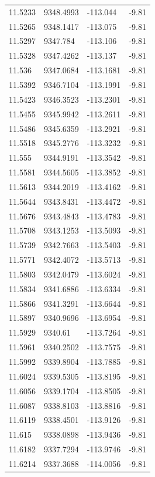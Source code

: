 \begin{table}[H]
\begin{tabular}{llll}
11.5233 & 9348.4993 & -113.044 & -9.81 \\
11.5265 & 9348.1417 & -113.075 & -9.81 \\
11.5297 & 9347.784 & -113.106 & -9.81 \\
11.5328 & 9347.4262 & -113.137 & -9.81 \\
11.536 & 9347.0684 & -113.1681 & -9.81 \\
11.5392 & 9346.7104 & -113.1991 & -9.81 \\
11.5423 & 9346.3523 & -113.2301 & -9.81 \\
11.5455 & 9345.9942 & -113.2611 & -9.81 \\
11.5486 & 9345.6359 & -113.2921 & -9.81 \\
11.5518 & 9345.2776 & -113.3232 & -9.81 \\
11.555 & 9344.9191 & -113.3542 & -9.81 \\
11.5581 & 9344.5605 & -113.3852 & -9.81 \\
11.5613 & 9344.2019 & -113.4162 & -9.81 \\
11.5644 & 9343.8431 & -113.4472 & -9.81 \\
11.5676 & 9343.4843 & -113.4783 & -9.81 \\
11.5708 & 9343.1253 & -113.5093 & -9.81 \\
11.5739 & 9342.7663 & -113.5403 & -9.81 \\
11.5771 & 9342.4072 & -113.5713 & -9.81 \\
11.5803 & 9342.0479 & -113.6024 & -9.81 \\
11.5834 & 9341.6886 & -113.6334 & -9.81 \\
11.5866 & 9341.3291 & -113.6644 & -9.81 \\
11.5897 & 9340.9696 & -113.6954 & -9.81 \\
11.5929 & 9340.61 & -113.7264 & -9.81 \\
11.5961 & 9340.2502 & -113.7575 & -9.81 \\
11.5992 & 9339.8904 & -113.7885 & -9.81 \\
11.6024 & 9339.5305 & -113.8195 & -9.81 \\
11.6056 & 9339.1704 & -113.8505 & -9.81 \\
11.6087 & 9338.8103 & -113.8816 & -9.81 \\
11.6119 & 9338.4501 & -113.9126 & -9.81 \\
11.615 & 9338.0898 & -113.9436 & -9.81 \\
11.6182 & 9337.7294 & -113.9746 & -9.81 \\
11.6214 & 9337.3688 & -114.0056 & -9.81 \\

\end{tabular}
\end{table}
